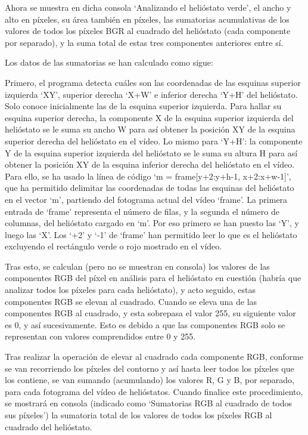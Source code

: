 \documentclass[12pt]{article}
\begin{document}
Ahora se muestra en dicha consola ‘Analizando el helióstato verde’, el ancho y alto en píxeles, su área también en píxeles, las sumatorias acumulativas de los valores de todos los píxeles BGR al cuadrado del helióstato (cada componente por separado), y la suma total de estas tres componentes anteriores entre sí.

Los datos de las sumatorias se han calculado como sigue:

Primero, el programa detecta cuáles son las coordenadas de las esquinas superior izquierda ‘XY’, superior derecha ‘X+W’ e inferior derecha ‘Y+H’ del helióstato. Solo conoce inicialmente las de la esquina superior izquierda. Para hallar su esquina superior derecha, la componente X de la esquina superior izquierda del helióstato se le suma su ancho W para así obtener la posición XY de la esquina superior derecha del helióstato en el vídeo. Lo mismo para ‘Y+H’: la componente Y de la esquina superior izquierda del helióstato se le suma su altura H para así obtener la posición XY de la esquina inferior derecha del helióstato en el vídeo. Para ello, se ha usado la línea de código ‘m = frame[y+2:y+h-1, x+2:x+w-1]’, que ha permitido delimitar las coordenadas de todas las esquinas del helióstato en el vector ‘m’, partiendo del fotograma actual del vídeo ‘frame’. La primera entrada de ‘frame’ representa el número de filas, y la segunda el número de columnas, del helióstato cargado en ‘m’. Por eso primero se han puesto las ‘Y’, y luego las ‘X’. Los ‘+2’ y ‘-1’ de ‘frame’ han permitido leer lo que es el helióstato excluyendo el rectángulo verde o rojo mostrado en el vídeo.

Tras esto, se calculan (pero no se muestran en consola) los valores de las componentes RGB del píxel en análisis para el helióstato en cuestión (habría que analizar todos los píxeles para cada helióstato), y acto seguido, estas componentes RGB se elevan al cuadrado. Cuando se eleva una de las componentes RGB al cuadrado, y esta sobrepasa el valor 255, su siguiente valor es 0, y así sucesivamente. Esto es debido a que las componentes RGB solo se representan con valores comprendidos entre 0 y 255.

Tras realizar la operación de elevar al cuadrado cada componente RGB, conforme se van recorriendo los píxeles del contorno y así hasta leer todos los píxeles que los contiene, se van sumando (acumulando) los valores R, G y B, por separado, para cada fotograma del vídeo de helióstatos. Cuando finalice este procedimiento, se mostrará en consola (indicado como ‘Sumatorias RGB al cuadrado de todos sus píxeles’) la sumatoria total de los valores de todos los píxeles RGB al cuadrado del helióstato.
\end{document}
